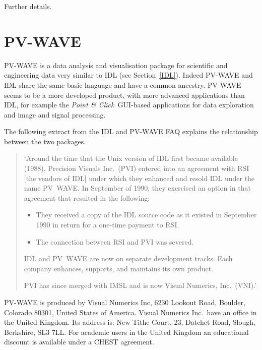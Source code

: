 \documentclass[twoside,11pt]{article}
\newcommand{\htmladdnormallink}[2]{#1}
\newcommand{\xlabel}[1]{}
\begin{document}
\begin{htmlonly}
\htmladdnormallink{Further details}
{http://www.roe.ac.uk/acdwww/vissys/idl.html}.
\end{htmlonly}


\section{PV-WAVE \label{PVWAVE} \xlabel{PVWAVE} }

PV-WAVE is a data analysis and visualisation package for scientific
and engineering data very similar to IDL (see Section~\ref{IDL}).
Indeed PV-WAVE and IDL share the same basic language and have a common
ancestry. PV-WAVE seems to be a more developed product, with more
advanced applications than IDL, for example the {\it Point \& Click}\,
GUI-based applications for data exploration and image and signal
processing.

The following extract from the IDL and PV-WAVE FAQ explains the
relationship between the two packages.

\begin{quote}
`Around the time that the Unix version of IDL first became
available (1988), Precision Visuals Inc.\ (PVI) entered into an agreement
with RSI [the vendors of IDL] under which they enhanced and resold IDL
under the name PV~WAVE. In September of 1990, they exercised an option in
that agreement that resulted in the following:

\begin{itemize}

  \item They received a copy of the IDL source code as it existed in
   September 1990 in return for a one-time payment to RSI.

  \item The connection between RSI and PVI was severed.

\end{itemize}

IDL and PV~WAVE are now on separate development tracks. Each company
enhances, supports, and maintains its own product.

PVI has since merged with IMSL and is now Visual Numerics, Inc.\ (VNI).'
\end{quote}

PV-WAVE is produced by Visual Numerics Inc, 6230 Lookout Road, Boulder,
Colorado 80301, United States of America.  Visual Numerics Inc.\ have an
office in the United Kingdom. Its address is: New Tithe Court, 23,
Datchet Road, Slough, Berkshire, SL3 7LL. For academic users in the
United Kingdom an educational discount is available under a CHEST
agreement.
\end{document}
